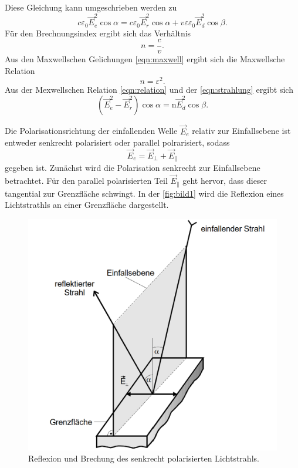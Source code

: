 Diese Gleichung kann umgeschrieben werden zu 
\begin{equation}
        c \varepsilon_0 \vec{E}_e^2 \cos \alpha=c \varepsilon_0 \vec{E}_r^2 \cos \alpha+v \varepsilon \varepsilon_0 \vec{E}_d^2 \cos \beta.
        \label{eqn:strahlung}
\end{equation}
Für den Brechnungsindex ergibt sich das Verhältnis
\begin{equation}
    n = \frac{c}{v}.
    \label{eqn:brechungsindex}
\end{equation}
Aus den Maxwellschen Gelichungen \eqref{eqn:maxwell} ergibt sich die Maxwellsche Relation
\begin{equation}
    n = \varepsilon^2 .
    \label{eqn:relation}
\end{equation}
Aus der Mexwellschen Relation \eqref{eqn:relation} und der \autoref{eqn:strahlung} ergibt sich 
\begin{equation}
    \left(\vec{E}_e^2-\vec{E}_r^2\right) \cos \alpha=\mathrm{n} \vec{E}_d^2 \cos \beta .
\end{equation}

Die Polarisationsrichtung der einfallenden Welle $\vec{E}_e$ relativ zur Einfallsebene ist entweder senkrecht polarisiert oder parallel polrarisiert,
sodass
\begin{equation}
        \vec{E}_e=\vec{E}_{\perp}+\vec{E}_{\|}
\end{equation}
gegeben ist.
Zunächst wird die Polarisation senkrecht zur Einfallsebene betrachtet. Für den parallel polarisierten Teil  $\vec{E}_{\|}$ geht hervor, dass 
dieser tangential zur Grenzfläche schwingt. In der \autoref{fig:bild1} wird die Reflexion eines Lichtstrathls an einer Grenzfläche 
dargestellt.

\begin{figure}[H]
	\centering
	\includegraphics[width=0.5\linewidth]{content/grafik/bild1.png}
	\caption{Reflexion und Brechung des senkrecht polarisierten Lichtstrahls. \cite{fresnel}}
	\label{fig:bild1}
\end{figure}


